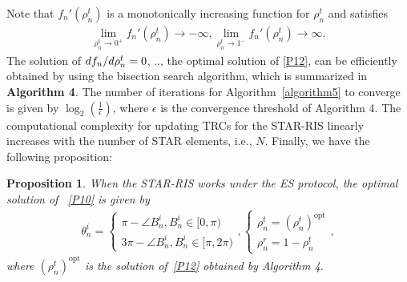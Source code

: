 \documentclass[12pt, draftclsnofoot, onecolumn]{IEEEtran}
\newcommand{\ie}{\text{i}.\text{e}.}
\newtheorem{proposition}{Proposition}
\begin{document}
Note that $f_{n}'\left(\rho_n^t\right)$ is a monotonically increasing function for $\rho_n^t$ and satisfies
\begin{equation}
\begin{aligned}
\mathop {\lim }\limits_{\rho_n^t \to 0^+}f_{n}'\left(\rho_n^t\right) \to -\infty, \mathop {\lim }\limits_{\rho_n^t \to 1^-}f_{n}'\left(\rho_n^t\right) \to \infty. 
\end{aligned}
\end{equation}
The solution of ${{d {f_{n}}} \mathord{\left/{\vphantom {{d {f_{n}}} {d {\rho_n^t}}}} \right.\kern-\nulldelimiterspace} {d {\rho_n^t}}}=0$, \ie, the optimal solution of \eqref{P12}, can be efficiently obtained by using the bisection search algorithm, which is summarized in \textbf{Algorithm 4}. The number of iterations for Algorithm~\ref{algorithm5} to converge is given by $\log_2\left(\frac{1}{\epsilon}\right)$, where $\epsilon$ is the convergence threshold of Algorithm 4. The computational complexity for updating TRCs for the STAR-RIS linearly increases with the number of STAR elements, i.e., $N$. Finally, we have the following proposition:
\begin{proposition}\label{proposition1}
\emph{When the STAR-RIS works under the ES protocol, the optimal solution of }~\eqref{P10} \emph{is given by}
\begin{equation}\label{ESphase}
\begin{aligned}
\theta _n^i = \left\{ {\begin{array}{*{20}{l}}
{\pi  - \angle B_n^i, B_n^i \in[0,\pi)}\\
{3\pi  - \angle B_n^i, B_n^i \in[\pi,2\pi)}
\end{array}} \right., \left\{ {\begin{array}{*{20}{l}}
{\rho _n^t = \left(\rho _n^t\right)^{\text{opt}}}\\
{\rho _n^r = 1-\rho _n^t}
\end{array}} \right.,
\end{aligned}
\end{equation}
\emph{where} $\left(\rho _n^t\right)^{\text{opt}}$ \emph{is the solution of}~\eqref{P12} \emph{obtained by Algorithm 4.}
\end{proposition}
\begin{algorithm}[htbp]
\caption{Bisection Search Algorithm for~\eqref{P13}}\label{algorithm5}
\begin{algorithmic}[1]
\end{algorithmic}
\end{algorithm} 
\end{document}
